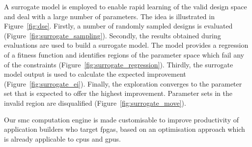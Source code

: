 A surrogate model is employed to enable rapid learning of the valid design space and deal with a large number of parameters.
The idea is illustrated in Figure~\ref{fig:dse}.
Firstly, a number of randomly sampled designs is evaluated (Figure~\ref{fig:surrogate_sampling}).
Secondly, the results obtained during evaluations are used to build a surrogate model.
The model provides a regression of a fitness function and identifies regions of the parameter space which fail any of the constraints (Figure~\ref{fig:surrogate_regression}).
Thirdly, the surrogate model output is used to calculate the expected improvement (Figure~\ref{fig:surrogate_ei}).
Finally, the exploration converges to the parameter set that is expected to offer the highest improvement.
Parameter sets in the invalid region are disqualified (Figure~\ref{fig:surrogate_move}).

Our \gls{smc} computation engine is made customisable to improve productivity of application builders who target \gls{fpga}s, based on an optimisation approach which is already applicable to \gls{cpu}s and \gls{gpu}s. 

